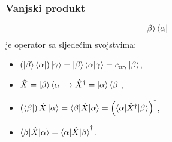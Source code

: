 \documentclass{article}
\numberwithin{equation}{section}
\begin{document}
\subsubsection{Vanjski produkt}
\begin{equation}
	\ket{\beta}\bra{\alpha}
\end{equation}
je operator sa sljedećim svojstvima:
\begin{itemize}
	\item $\left(\ket{\beta}\bra{\alpha}\right)\ket{\gamma} = \ket{\beta}\braket{\alpha|\gamma} = c_{\alpha\gamma}\ket{\beta}$,
	\item $\hat{X} = \ket{\beta}\bra{\alpha} \rightarrow \hat{X}^{\dagger} = \ket{\alpha}\bra{\beta}$,
	\item $\left(\bra{\beta}\right)\hat{X}\ket{\alpha} = \braket{\beta|\hat{X}|\alpha} = \left(\braket{\alpha|\hat{X}^{\dagger}|\beta}\right)^{\dagger}$,
	\item $\braket{\beta|\hat{X}|\alpha} = \braket{\alpha|\hat{X}|\beta}^{\dagger}$.
\end{itemize}
\end{document}
